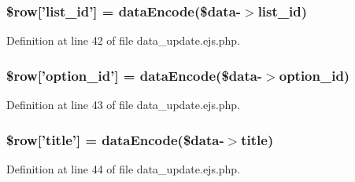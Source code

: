 \hypertarget{administration_2lists_2data__update_8ejs_8php_a76772cd03c99434f33a506cf72f49b4f}{
\subsubsection[{\$row}]{\setlength{\rightskip}{0pt plus 5cm}\$row\mbox{[}'list\-\_\-id'\mbox{]} = {\bf data\-Encode}(\$data-\/$>$list\-\_\-id)}}\label{administration_2lists_2data__update_8ejs_8php_a76772cd03c99434f33a506cf72f49b4f}


\-Definition at line 42 of file data\-\_\-update.\-ejs.\-php.

\hypertarget{administration_2lists_2data__update_8ejs_8php_ab8498685515a366e1b6d5caad5eb57ee}{
\subsubsection[{\$row}]{\setlength{\rightskip}{0pt plus 5cm}\$row\mbox{[}'option\-\_\-id'\mbox{]} = {\bf data\-Encode}(\$data-\/$>$option\-\_\-id)}}\label{administration_2lists_2data__update_8ejs_8php_ab8498685515a366e1b6d5caad5eb57ee}


\-Definition at line 43 of file data\-\_\-update.\-ejs.\-php.

\hypertarget{administration_2lists_2data__update_8ejs_8php_a70d36cba6a35524466f2a4c8112c8e4e}{
\subsubsection[{\$row}]{\setlength{\rightskip}{0pt plus 5cm}\$row\mbox{[}'title'\mbox{]} = {\bf data\-Encode}(\$data-\/$>$title)}}\label{administration_2lists_2data__update_8ejs_8php_a70d36cba6a35524466f2a4c8112c8e4e}


\-Definition at line 44 of file data\-\_\-update.\-ejs.\-php.

